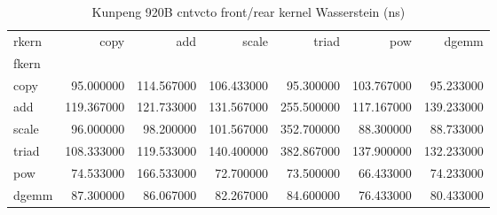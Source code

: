 \begin{table}
\caption{Kunpeng 920B cntvcto front/rear kernel Wasserstein (ns)}
\begin{tabular}{lrrrrrr}
\toprule
rkern & copy & add & scale & triad & pow & dgemm \\
fkern &  &  &  &  &  &  \\
\midrule
copy & 95.000000 & 114.567000 & 106.433000 & 95.300000 & 103.767000 & 95.233000 \\
add & 119.367000 & 121.733000 & 131.567000 & 255.500000 & 117.167000 & 139.233000 \\
scale & 96.000000 & 98.200000 & 101.567000 & 352.700000 & 88.300000 & 88.733000 \\
triad & 108.333000 & 119.533000 & 140.400000 & 382.867000 & 137.900000 & 132.233000 \\
pow & 74.533000 & 166.533000 & 72.700000 & 73.500000 & 66.433000 & 74.233000 \\
dgemm & 87.300000 & 86.067000 & 82.267000 & 84.600000 & 76.433000 & 80.433000 \\
\bottomrule
\end{tabular}
\end{table}
